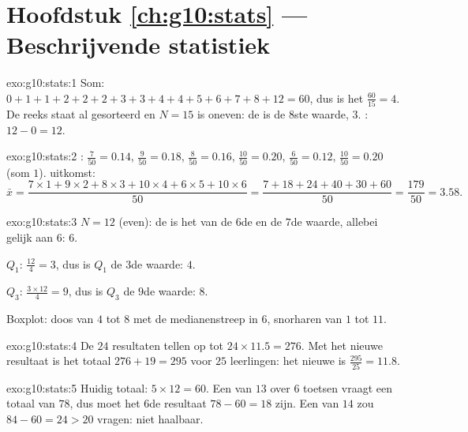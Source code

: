 \section*{Hoofdstuk \ref{ch:g10:stats} --- Beschrijvende statistiek}

\begin{solution}{exo:g10:stats:1}
Som: $0+1+1+2+2+2+3+3+4+4+5+6+7+8+12 = 60$, dus is het 
$\frac{60}{15} = 4$. De reeks staat al gesorteerd en $N = 15$ is oneven: de
 is de $8$ste waarde, $3$. : $12 - 0 = 12$.
\end{solution}

\begin{solution}{exo:g10:stats:2}
: $\frac{7}{50} = 0.14$, $\frac{9}{50} = 0.18$,
$\frac{8}{50} = 0.16$, $\frac{10}{50} = 0.20$, $\frac{6}{50} = 0.12$,
$\frac{10}{50} = 0.20$ (som $1$).  uitkomst:
\[
\bar x = \frac{7 \times 1 + 9 \times 2 + 8 \times 3 + 10 \times 4
+ 6 \times 5 + 10 \times 6}{50}
= \frac{7 + 18 + 24 + 40 + 30 + 60}{50}
= \frac{179}{50} = 3.58 .
\]
\end{solution}

\begin{solution}{exo:g10:stats:3}
$N = 12$ (even): de  is het  van de $6$de en de $7$de waarde,
allebei gelijk aan $6$:  $6$.

$Q_1$: $\frac{12}{4} = 3$, dus is $Q_1$ de $3$de waarde: $4$.

$Q_3$: $\frac{3 \times 12}{4} = 9$, dus is $Q_3$ de $9$de waarde: $8$.

Boxplot: doos van $4$ tot $8$ met de medianenstreep in $6$, snorharen van
$1$ tot $11$.
\end{solution}

\begin{solution}{exo:g10:stats:4}
De $24$ resultaten tellen op tot $24 \times 11.5 = 276$. Met het nieuwe
resultaat is het totaal $276 + 19 = 295$ voor $25$ leerlingen: het nieuwe
 is $\frac{295}{25} = 11.8$.
\end{solution}

\begin{solution}{exo:g10:stats:5}
Huidig totaal: $5 \times 12 = 60$. Een  van $13$ over $6$ toetsen
vraagt een totaal van $78$, dus moet het $6$de resultaat $78 - 60 = 18$ zijn.
Een  van $14$ zou $84 - 60 = 24 > 20$ vragen: niet haalbaar.
\end{solution}


